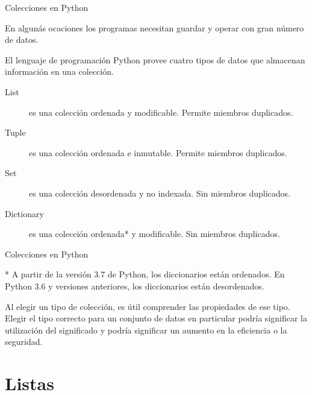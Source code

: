 
\begin{frame}[c]{Colecciones en Python}

  En algunás ocaciones los programas necesitan guardar y operar con gran
  número de datos.

  \vspace{\baselineskip}
  El lenguaje de programación Python provee cuatro tipos de datos
  que almacenan información en una colección.

  \pausa
  \vspace{\baselineskip}
  \begin{description}
    \item[List ] es una colección ordenada y modificable.
      Permite miembros duplicados.
    \pausa
    \item[Tuple ] es una colección ordenada e inmutable.
      Permite miembros duplicados.
    \pausa
    \item[Set ] es una colección desordenada y no indexada.
      Sin miembros duplicados.
    \pausa
    \item[Dictionary ] es una colección ordenada* y modificable.
      Sin miembros duplicados.
  \end{description}

\end{frame}

\begin{frame}[c]{Colecciones en Python}

  \begin{exampleblock}{}
    * A partir de la versión 3.7 de Python, los diccionarios están ordenados.
    En Python 3.6 y versiones anteriores, los diccionarios están desordenados.
  \end{exampleblock}

  \vspace{\baselineskip}
  Al elegir un tipo de colección, es útil comprender las propiedades de ese
  tipo. Elegir el tipo correcto para un conjunto de datos en particular
  podría significar la utilización del significado y podría significar un
  aumento en la eficiencia o la seguridad. 
\end{frame}

\section{Listas}

